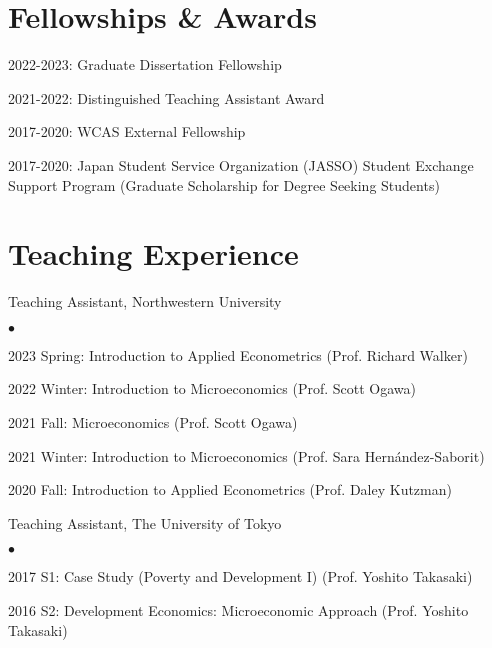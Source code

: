 \documentclass[margin,line]{res}
\newenvironment{list1}{
  \begin{list}{\ding{113}}{%
      \setlength{\itemsep}{.025in}
      \setlength{\parsep}{0in} \setlength{\parskip}{0in}
      \setlength{\topsep}{0in} \setlength{\partopsep}{0in}
      \setlength{\leftmargin}{0.17in}}}{\end{list}}
\newenvironment{list2}{
  \begin{list}{$\bullet$}{%
      \setlength{\itemsep}{0in}
      \setlength{\parsep}{0in} \setlength{\parskip}{0in}
      \setlength{\topsep}{0in} \setlength{\partopsep}{0in}
      \setlength{\leftmargin}{0.2in}}}{\end{list}}
\begin{document}
\begin{resume}
\section{Fellowships \& Awards}
\begin{list1}
\item[] 2022-2023: Graduate Dissertation Fellowship
\item[] 2021-2022: Distinguished Teaching Assistant Award
\item[] 2017-2020: WCAS External Fellowship
\item[] 2017-2020: Japan Student Service Organization (JASSO) Student Exchange Support Program (Graduate Scholarship for Degree Seeking Students)
\end{list1}

\section{Teaching Experience}
\begin{list1}
\item[] Teaching Assistant, Northwestern University
	\begin{list2}
		\item[] 2023 Spring: Introduction to Applied Econometrics (Prof. Richard Walker)
		\item[] 2022 Winter: Introduction to Microeconomics (Prof. Scott Ogawa)
		\item[] 2021 Fall: Microeconomics (Prof. Scott Ogawa)
		\item[] 2021 Winter: Introduction to Microeconomics (Prof. Sara Hernández-Saborit)
		\item[] 2020 Fall: Introduction to Applied Econometrics (Prof. Daley Kutzman)
	\end{list2}
\item[] Teaching Assistant, The University of Tokyo
	\begin{list2}
		\item[] 2017 S1: Case Study (Poverty and Development I) (Prof. Yoshito Takasaki)
		\item[] 2016 S2: Development Economics: Microeconomic Approach (Prof. Yoshito Takasaki)
	\end{list2}
\end{list1}


\end{resume}
\end{document}
